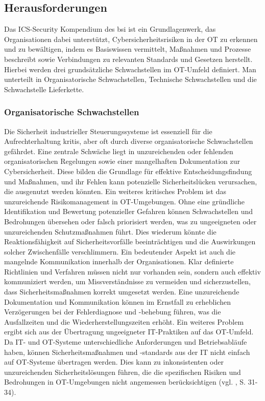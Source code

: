 \subsection{Herausforderungen}

Das ICS-Security Kompendium des \ac{bsi} ist ein Grundlagenwerk, das Organisationen dabei unterstützt, Cybersicherheitsrisiken in der OT zu erkennen und zu bewältigen, indem es Basiswissen vermittelt, Maßnahmen und Prozesse beschreibt sowie Verbindungen zu relevanten Standards und Gesetzen herstellt. Hierbei werden drei grundsätzliche Schwachstellen im OT-Umfeld definiert. Man unterteilt in Organisatorische Schwachstellen, Technische Schwachstellen und die Schwachstelle Lieferkette. 

\subsubsection{Organisatorische Schwachstellen}

Die Sicherheit industrieller Steuerungssysteme ist essenziell für die Aufrechterhaltung \ac{kritis}, aber oft durch diverse organisatorische Schwachstellen gefährdet. Eine zentrale Schwäche liegt in unzureichenden oder fehlenden organisatorischen Regelungen sowie einer mangelhaften Dokumentation zur Cybersicherheit. Diese bilden die Grundlage für effektive Entscheidungsfindung und Maßnahmen, und ihr Fehlen kann potenzielle Sicherheitslücken verursachen, die ausgenutzt werden könnten.
Ein weiteres kritisches Problem ist das unzureichende Risikomanagement in OT-Umgebungen. Ohne eine gründliche Identifikation und Bewertung potenzieller Gefahren können Schwachstellen und Bedrohungen übersehen oder falsch priorisiert werden, was zu ungeeigneten oder unzureichenden Schutzmaßnahmen führt. Dies wiederum könnte die Reaktionsfähigkeit auf Sicherheitsvorfälle beeinträchtigen und die Auswirkungen solcher Zwischenfälle verschlimmern. Ein bedeutender Aspekt ist auch die mangelnde Kommunikation innerhalb der Organisationen. Klar definierte Richtlinien und Verfahren müssen nicht nur vorhanden sein, sondern auch effektiv kommuniziert werden, um Missverständnisse zu vermeiden und sicherzustellen, dass Sicherheitsmaßnahmen korrekt umgesetzt werden. Eine unzureichende Dokumentation und Kommunikation können im Ernstfall zu erheblichen Verzögerungen bei der Fehlerdiagnose und -behebung führen, was die Ausfallzeiten und die Wiederherstellungszeiten erhöht. Ein weiteres Problem ergibt sich aus der Übertragung ungeeigneter IT-Praktiken auf das OT-Umfeld. Da IT- und OT-Systeme unterschiedliche Anforderungen und Betriebsabläufe haben, können Sicherheitsmaßnahmen und -standards aus der IT nicht einfach auf OT-Systeme übertragen werden. Dies kann zu inkonsistenten oder unzureichenden Sicherheitslösungen führen, die die spezifischen Risiken und Bedrohungen in OT-Umgebungen nicht angemessen berücksichtigen (vgl. \cite{ICS}, S. 31-34).
\clearpage
